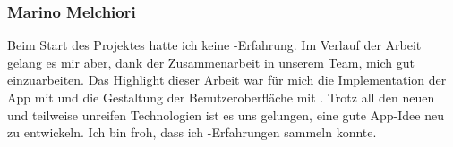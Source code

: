 \subsubsection{Marino Melchiori}
Beim Start des Projektes hatte ich keine -Erfahrung. 
Im Verlauf der Arbeit gelang es mir aber, dank der Zusammenarbeit in unserem Team, mich gut  einzuarbeiten.
Das Highlight dieser Arbeit war für mich die Implementation der App mit  und die Gestaltung der Benutzeroberfläche mit .
Trotz all den neuen und teilweise unreifen Technologien ist es uns gelungen, eine gute App-Idee neu zu entwickeln.
Ich bin froh, dass ich -Erfahrungen sammeln konnte.